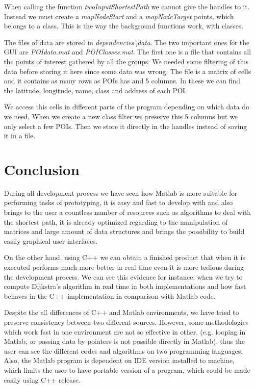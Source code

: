 \documentclass{article}
\begin{document}
When calling the function \textit{twoInputShortestPath} we cannot give the handles to it. Instead we must create a \textit{mapNodeStart} and a \textit{mapNodeTarget} points, which belongs to a class. This is the way the background functions work, with classes.

The files of data are stored in \textit{dependencies\textbackslash data}. The two important ones for the GUI are \textit{POIdata.mat} and \textit{POIClasses.mat}. The first one is a file that contains all the points of interest gathered by all the groups. We needed some filtering of this data before storing it here since some data was wrong. The file is a matrix of cells and it contains as many rows as POIs has and 5 columns. In these we can find the latitude, longitude, name, class and address of each POI.

We access this cells in different parts of the program depending on which data do we need. When we create a new class filter we preserve this 5 columns but we only select a few POIs. Then we store it directly in the handles instead of saving it in a file.

\clearpage
\section{Conclusion}
During all development process we have seen how Matlab is more suitable for performing tasks of prototyping, it is easy and fast to develop with and also brings to the user a countless number of resources such as algorithms to deal with the shortest path, it is already optimized regarding to the manipulation of matrices and large amount of data structures and brings the possibility to build easily graphical user interfaces.

On the other hand, using C++ we can obtain a finished product that when it is executed performs much more better in real time even it is more tedious during the development process. We can see this evidence for instance, when we try to compute Dijkstra's algorithm in real time in both implementations and how fast behaves in the C++ implementation in comparison with Matlab code. 

Despite the all differences of C++ and Matlab environments, we have tried to preserve consistency between two different sources. However, some methodologies which work fast in one environment are not so effective in other, (e.g. looping in Matlab, or passing data by pointers is not possible directly in Matlab), thus the user can see the different codes and algorithms on two programming languages. Also, the Matlab program is dependent on IDE version installed to machine, which limits the user to have portable version of a program, which could be made easily using C++ release. 
\end{document}

